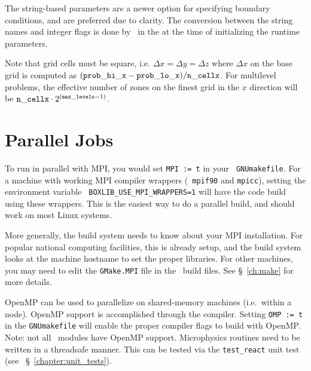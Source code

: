 \begin{itemize}
\begin{itemize}
   \end{itemize}

  The string-based parameters are a newer option for specifying
  boundary conditions, and are preferred due to clarity.  The
  conversion between the string names and integer flags is done
  by \boxlib\ in the  at the time of initializing
  the runtime parameters.

\end{itemize}

Note that grid cells must be square, i.e. $\Delta x = \Delta y = \Delta z$
where $\Delta x$ on the base grid is computed as $({\tt prob\_hi\_x}
- {\tt prob\_lo\_x})/{\tt n\_cellx}$.  For multilevel problems, the effective
number of zones on the finest grid in the $x$ direction will be
${\tt n\_cellx} \cdot 2^{({\tt max\_levels} -1)}$.



\section{Parallel Jobs}

To run in parallel with MPI, you would set {\tt MPI := t} in your {\tt
GNUmakefile}.  For a machine with working MPI compiler wrappers ({\tt
mpif90} and {\tt mpicc}), setting the environment variable {\tt
BOXLIB\_USE\_MPI\_WRAPPERS=1} will have the code build using these
wrappers.  This is the easiest way to do a parallel build, and should
work on most Linux systems.

More generally, the build system needs to know about your MPI
installation.  For popular national computing facilities, this is
already setup, and the build system looks at the machine hostname to
set the proper libraries.  For other machines, you may need to edit
the {\tt GMake.MPI} file in the \boxlib\ build files.  See
\S~\ref{ch:make} for more details.

OpenMP can be used to parallelize on shared-memory machines (i.e.\
within a node).  OpenMP support is accomplished through the compiler.
Setting {\tt OMP := t} in the {\tt GNUmakefile} will enable the proper
compiler flags to build with OpenMP.  Note: not all \maestro\ modules 
have OpenMP support.  Microphysics routines need to be written in a
threadsafe manner.  This can be tested via the {\tt test\_react} unit
test (see ~\S~\ref{chapter:unit_tests}).

